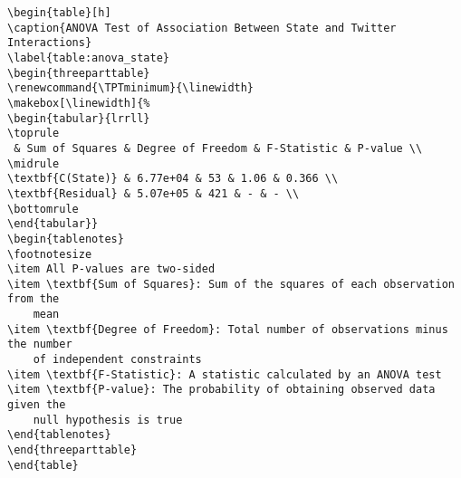 \documentclass[11pt]{article}
\begin{document}
\begin{Verbatim}[tabsize=4]
\begin{table}[h]
\caption{ANOVA Test of Association Between State and Twitter Interactions}
\label{table:anova_state}
\begin{threeparttable}
\renewcommand{\TPTminimum}{\linewidth}
\makebox[\linewidth]{%
\begin{tabular}{lrrll}
\toprule
 & Sum of Squares & Degree of Freedom & F-Statistic & P-value \\
\midrule
\textbf{C(State)} & 6.77e+04 & 53 & 1.06 & 0.366 \\
\textbf{Residual} & 5.07e+05 & 421 & - & - \\
\bottomrule
\end{tabular}}
\begin{tablenotes}
\footnotesize
\item All P-values are two-sided
\item \textbf{Sum of Squares}: Sum of the squares of each observation from the
	mean
\item \textbf{Degree of Freedom}: Total number of observations minus the number
	of independent constraints
\item \textbf{F-Statistic}: A statistic calculated by an ANOVA test
\item \textbf{P-value}: The probability of obtaining observed data given the
	null hypothesis is true
\end{tablenotes}
\end{threeparttable}
\end{table}

\end{Verbatim}




\end{document}
